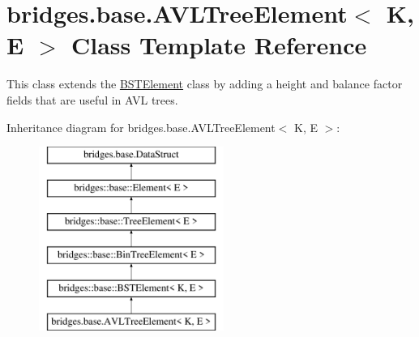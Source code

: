 \hypertarget{classbridges_1_1base_1_1_a_v_l_tree_element}{}\section{bridges.\+base.\+A\+V\+L\+Tree\+Element$<$ K, E $>$ Class Template Reference}
\label{classbridges_1_1base_1_1_a_v_l_tree_element}


This class extends the \mbox{\hyperlink{classbridges_1_1base_1_1_b_s_t_element}{B\+S\+T\+Element}} class by adding a height and balance factor fields that are useful in A\+VL trees.  


Inheritance diagram for bridges.\+base.\+A\+V\+L\+Tree\+Element$<$ K, E $>$\+:\begin{figure}[H]
\begin{center}
\leavevmode
\includegraphics[height=6.000000cm]{classbridges_1_1base_1_1_a_v_l_tree_element}
\end{center}
\end{figure}
